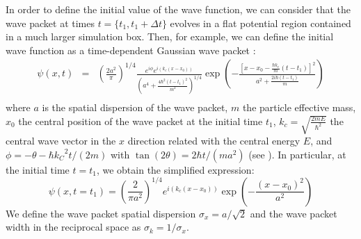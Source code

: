 \documentclass[nofootinbib, secnumarabic, amsmath, nobibnotes,11pt,aps,pra, floatfix]{revtex4-1}
\begin{document}
In order to define the initial value of the wave function, we can consider that the wave packet at times $t = \{t_1,t_1 + \Delta t\}$ evolves in a flat potential region contained in a much larger simulation box. Then, for example, we can define the  initial wave function as a time-dependent Gaussian wave packet \cite{om.cohen}:
\begin{eqnarray}
\psi (x,t) &=& {{\left( \frac{2{{a}^{2}}}{\pi } \right)}^{1/4}}\frac{{{e}^{i\phi }}{e}^{i(k_c(x-x_0))}}{{{\left( {{a}^{4}} + \frac{4{{\hbar }^{2}}{{(t-{{t}_{1}})}^{2}}}{{{m}^{2}}} \right)}^{1/4}}}\exp \left(-\frac{{{\left[x - {{x}_0} - \frac{\hbar {{k}_{c}}}{m}(t - {{t}_{1}}) \right]}^{2}}}{{{a}^{2}} + \frac{2i\hbar (t - {{t}_{1}})}{m}} \right)\nonumber\\
\label{om.finite-difference_innitial}
\end{eqnarray}
where $a$ is the spatial dispersion of the wave packet, $m$ the particle effective mass, $x_0$ the central position of the wave packet at the initial time $t_1$, ${k}_{c} = \sqrt{\frac{2mE}{{\hbar }^{2}}}$ the central wave vector in the $x$ direction related with the central energy $E$, and $\phi = -\theta - {\hbar {k_C}^{2}t}/{(2m)}$ with $\tan (2 \theta ) = {2 \hbar t}/{(m{{a}^{2}})}$ (see \cite{om.cohen}). In particular, at the initial time $t = t_1$, we obtain the simplified expression:
\begin{equation}
\psi (x,t = t_1) = {{\left( \frac{2}{\pi {{a}^{2}}} \right)}^{1/4}}{{e}^{i\left( {{k}_{c}}(x-{{x}_0}) \right)}} \exp \left( -\frac{{{(x-{{x}_0})}^{2}}}{{{a}^{2}}} \right)
\end{equation}
We define the wave packet spatial dispersion ${{\sigma }_{x}} =
a/\sqrt{2}$ and the wave packet width in the reciprocal  space as
${{\sigma }_{k}} = 1/{{\sigma }_{x}}$.
\end{document}
